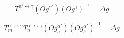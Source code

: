 $$T^{\alpha'\leftrightarrow\gamma}\left(Og^{\alpha'}\right)\left(Og^{\gamma}\right)^{-1} = \Delta g \label{eq:1}$$

$$T_{m}^{\alpha'\leftrightarrow\gamma}T_{n}^{\alpha'\leftrightarrow\gamma}\left(Og_{a}^{\alpha'}\right)\left(Og_{b}^{\alpha'}\right)^{-1} = \Delta g \label{eq:2}$$
